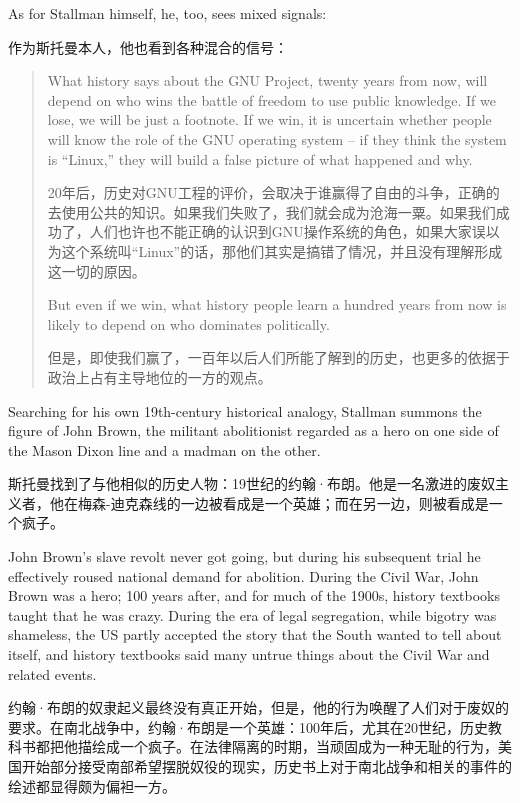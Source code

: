 \ifdefined\eng
As for Stallman himself, he, too, sees mixed signals:
\fi

\ifdefined\chs
作为斯托曼本人，他也看到各种混合的信号：
\fi

\begin{quote}
\ifdefined\eng
What history says about the GNU Project, twenty years from now, will depend on who wins the battle of freedom to use public knowledge. If we lose, we will be just a footnote. If we win, it is uncertain whether people will know the role of the GNU operating system -- if they think the system is ``Linux,'' they will build a false picture of what happened and why.
\fi

\ifdefined\chs
20年后，历史对GNU工程的评价，会取决于谁赢得了自由的斗争，正确的去使用公共的知识。如果我们失败了，我们就会成为沧海一粟。如果我们成功了，人们也许也不能正确的认识到GNU操作系统的角色，如果大家误以为这个系统叫``Linux''的话，那他们其实是搞错了情况，并且没有理解形成这一切的原因。
\fi

\ifdefined\eng
But even if we win, what history people learn a hundred years from now is likely to depend on who dominates politically.
\fi

\ifdefined\chs
但是，即使我们赢了，一百年以后人们所能了解到的历史，也更多的依据于政治上占有主导地位的一方的观点。
\fi
\end{quote}

\ifdefined\eng
Searching for his own 19th-century historical analogy, Stallman summons the figure of John Brown, the militant abolitionist regarded as a hero on one side of the Mason Dixon line and a madman on the other.
\fi

\ifdefined\chs
斯托曼找到了与他相似的历史人物：19世纪的约翰·布朗。他是一名激进的废奴主义者，他在梅森-迪克森线的一边被看成是一个英雄；而在另一边，则被看成是一个疯子。
\fi

\ifdefined\eng
John Brown's slave revolt never got going, but during his subsequent trial he effectively roused national demand for abolition. During the Civil War, John Brown was a hero; 100 years after, and for much of the 1900s, history textbooks taught that he was crazy. During the era of legal segregation, while bigotry was shameless, the US partly accepted the story that the South wanted to tell about itself, and history textbooks said many untrue things about the Civil War and related events.
\fi

\ifdefined\chs
约翰·布朗的奴隶起义最终没有真正开始，但是，他的行为唤醒了人们对于废奴的要求。在南北战争中，约翰·布朗是一个英雄：100年后，尤其在20世纪，历史教科书都把他描绘成一个疯子。在法律隔离的时期，当顽固成为一种无耻的行为，美国开始部分接受南部希望摆脱奴役的现实，历史书上对于南北战争和相关的事件的绘述都显得颇为偏袒一方。
\fi

